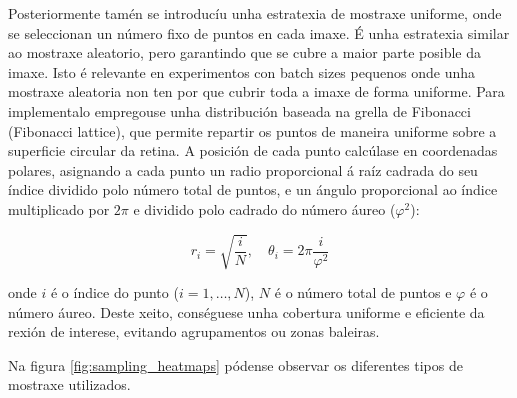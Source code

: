 Posteriormente tamén se introducíu unha estratexia de mostraxe uniforme, onde se seleccionan un número fixo de puntos en cada imaxe.
É unha estratexia similar ao mostraxe aleatorio, pero garantindo que se cubre a maior parte posible da imaxe. Isto é relevante en experimentos con batch sizes pequenos onde unha mostraxe aleatoria non ten por que cubrir toda a imaxe de forma uniforme.
Para implementalo empregouse unha distribución baseada na grella de Fibonacci (Fibonacci lattice), que permite repartir os puntos de maneira uniforme sobre a superficie circular da retina. 
A posición de cada punto calcúlase en coordenadas polares, asignando a cada punto un radio proporcional á raíz cadrada do seu índice dividido polo número total de puntos, e un ángulo proporcional ao índice multiplicado por $2\pi$ e dividido polo cadrado do número áureo ($\varphi^2$):

\[
r_i = \sqrt{\frac{i}{N}}, \quad \theta_i = 2\pi \frac{i}{\varphi^2}
\]

onde $i$ é o índice do punto ($i = 1, \dots, N$), $N$ é o número total de puntos e $\varphi$ é o número áureo. 
Deste xeito, conséguese unha cobertura uniforme e eficiente da rexión de interese, evitando agrupamentos ou zonas baleiras.

Na figura \ref{fig:sampling_heatmaps} pódense observar os diferentes tipos de mostraxe utilizados.

